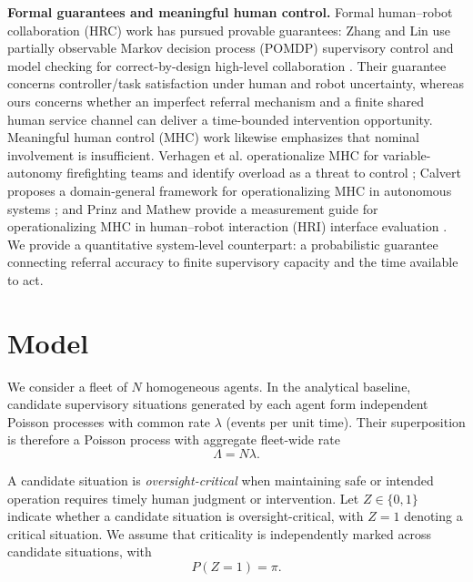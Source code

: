 \documentclass[letterpaper,10pt,conference]{ieeeconf}
\begin{document}
\textbf{Formal guarantees and meaningful human control.}
Formal human--robot collaboration (HRC) work has pursued provable guarantees: Zhang and Lin use partially observable Markov decision process (POMDP) supervisory control and model checking for correct-by-design high-level collaboration \cite{zhang2019performance}. Their guarantee concerns controller/task satisfaction under human and robot uncertainty, whereas ours concerns whether an imperfect referral mechanism and a finite shared human service channel can deliver a time-bounded intervention opportunity. Meaningful human control (MHC) work likewise emphasizes that nominal involvement is insufficient. Verhagen et al. operationalize MHC for variable-autonomy firefighting teams and identify overload as a threat to control \cite{verhagen2024mhc}; Calvert proposes a domain-general framework for operationalizing MHC in autonomous systems \cite{calvert2025mhc}; and Prinz and Mathew provide a measurement guide for operationalizing MHC in human--robot interaction (HRI) interface evaluation \cite{prinz2026operationalizing}. We provide a quantitative system-level counterpart: a probabilistic guarantee connecting referral accuracy to finite supervisory capacity and the time available to act.
\section{Model}
\label{sec:model}

We consider a fleet of \(N\) homogeneous agents. In the analytical baseline,
candidate supervisory situations generated by each agent form independent
Poisson processes with common rate \(\lambda\) (events per unit time).
Their superposition is therefore a Poisson process with aggregate fleet-wide
rate
\begin{equation}
\Lambda = N\lambda.
\end{equation}

A candidate situation is \emph{oversight-critical} when maintaining safe or
intended operation requires timely human judgment or intervention. Let
\(Z\in\{0,1\}\) indicate whether a candidate situation is oversight-critical,
with \(Z=1\) denoting a critical situation. We assume that criticality is
independently marked across candidate situations, with
\begin{equation}
P(Z=1)=\pi.
\end{equation}
\end{document}
